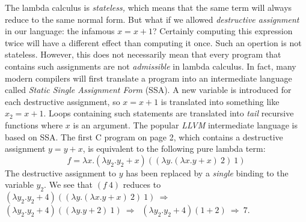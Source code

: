 The lambda calculus is {\em stateless,\/} which means that the same
term will always reduce to the same normal form.  But what if we allowed
{\em destructive assignment\/} in our language: the infamous 
$x=x+1$?  Certainly computing this expression twice will have a
different effect than computing it once.  Such an opertion is not
stateless.  However, this does not necessarily mean that every program
that contains such assignments are not {\em admissible\/} in lambda
calculus.  In fact, many modern compilers will first translate a program
into an intermediate language called {\em Static Single
  Assignment Form\/} (SSA).  A new variable is introduced for each
destructive assignment, so $x=x+1$ is translated into something
like $x_2=x+1$. Loops containing such statements are translated
into {\em tail\/} recursive functions where $x$ is an argument.  The
popular {\em LLVM\/} intermediate language is based on SSA. 
The first C program on page 2, which contains a destructive assignment
$y=y+x$, is equivalent to the following pure lambda term:
$$
f= \lambda x. (\lambda y_2.y_2+x) ((\lambda y.(\lambda x.y+x)~2)~1)
$$
The destructive assignment to $y$ has been replaced by a {\em single\/}
binding to the variable $y_2$.  We see that $(f~4)$ reduces to
$(\lambda y_2.y_2+4) ((\lambda y.(\lambda x.y+x)~2)~1) ~\Rightarrow~$
$(\lambda y_2.y_2+4) ((\lambda y.y+2)~1) ~\Rightarrow~$
$(\lambda y_2.y_2+4) (1+2) ~\Longrightarrow~ 7$.
